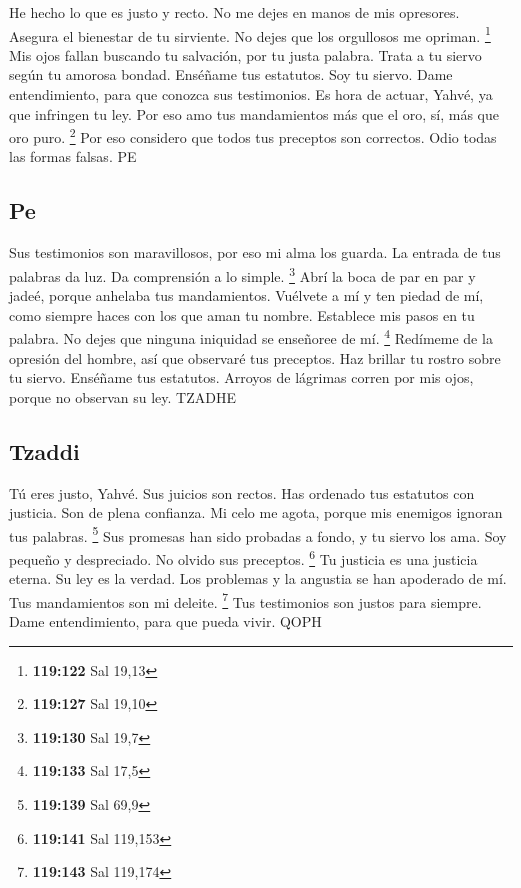 \begin{paracol}{2}
 He hecho lo que es justo y recto. No me dejes en manos
de mis opresores.  Asegura el bienestar de tu sirviente.
No dejes que los orgullosos me opriman. \footnote{\textbf{119:122} Sal
  19,13}  Mis ojos fallan buscando tu salvación, por tu
justa palabra.  Trata a tu siervo según tu amorosa
bondad. Enséñame tus estatutos.  Soy tu siervo. Dame
entendimiento, para que conozca sus testimonios.  Es
hora de actuar, Yahvé, ya que infringen tu ley.  Por eso
amo tus mandamientos más que el oro, sí, más que oro puro. \footnote{\textbf{119:127}
  Sal 19,10}  Por eso considero que todos tus preceptos
son correctos. Odio todas las formas falsas. PE

\hypertarget{pe}{%
\subsection{Pe}\label{pe}}

 Sus testimonios son maravillosos, por eso mi alma los
guarda.  La entrada de tus palabras da luz. Da
comprensión a lo simple. \footnote{\textbf{119:130} Sal 19,7}
 Abrí la boca de par en par y jadeé, porque anhelaba tus
mandamientos.  Vuélvete a mí y ten piedad de mí, como
siempre haces con los que aman tu nombre.  Establece mis
pasos en tu palabra. No dejes que ninguna iniquidad se enseñoree de mí.
\footnote{\textbf{119:133} Sal 17,5}  Redímeme de la
opresión del hombre, así que observaré tus preceptos. 
Haz brillar tu rostro sobre tu siervo. Enséñame tus estatutos.
 Arroyos de lágrimas corren por mis ojos, porque no
observan su ley. TZADHE

\hypertarget{tzaddi}{%
\subsection{Tzaddi}\label{tzaddi}}

 Tú eres justo, Yahvé. Sus juicios son rectos.
 Has ordenado tus estatutos con justicia. Son de plena
confianza.  Mi celo me agota, porque mis enemigos
ignoran tus palabras. \footnote{\textbf{119:139} Sal 69,9}
 Sus promesas han sido probadas a fondo, y tu siervo los
ama.  Soy pequeño y despreciado. No olvido sus
preceptos. \footnote{\textbf{119:141} Sal 119,153}  Tu
justicia es una justicia eterna. Su ley es la verdad. 
Los problemas y la angustia se han apoderado de mí. Tus mandamientos son
mi deleite. \footnote{\textbf{119:143} Sal 119,174}  Tus
testimonios son justos para siempre. Dame entendimiento, para que pueda
vivir. QOPH


\end{paracol}
